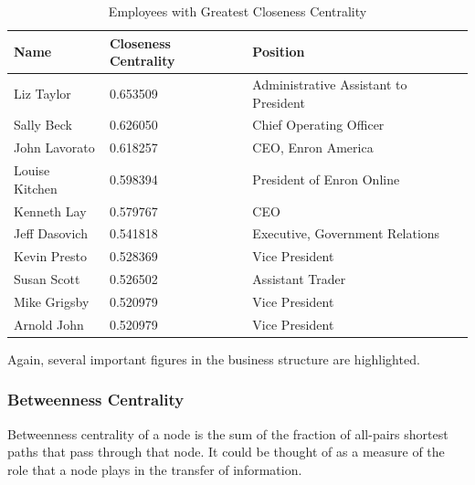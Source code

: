 \documentclass[12pt]{article}
\begin{document}
        \begin{table}[h]
        \caption{Employees with Greatest Closeness Centrality}
        \centering
        \begin{tabular}{|l|l|l|}
        \hline
        \textbf{Name} & \textbf{Closeness Centrality} & \textbf{Position}                     \\ \hline
        Liz Taylor        & 0.653509                      & Administrative Assistant to President \\ \hline
        Sally Beck        & 0.626050                      & Chief Operating Officer               \\ \hline
        John Lavorato     & 0.618257                      & CEO, Enron America                    \\ \hline
        Louise Kitchen    & 0.598394                      & President of Enron Online             \\ \hline
        Kenneth Lay       & 0.579767                      & CEO                                   \\ \hline
        Jeff Dasovich     & 0.541818                      & Executive, Government Relations       \\ \hline
        Kevin Presto      & 0.528369                      & Vice President                        \\ \hline
        Susan Scott       & 0.526502                      & Assistant Trader                      \\ \hline
        Mike Grigsby      & 0.520979                      & Vice President                        \\ \hline
        Arnold John       & 0.520979                      & Vice President                        \\ \hline
        \end{tabular}
        \end{table}
        
        Again, several important figures in the business structure are highlighted.  
        
	\subsubsection{Betweenness Centrality} Betweenness centrality of a node is the sum of the fraction of all-pairs shortest paths that pass through that node. It could be thought of as a measure of the role that a node plays in the transfer of information.
	
\end{document}
